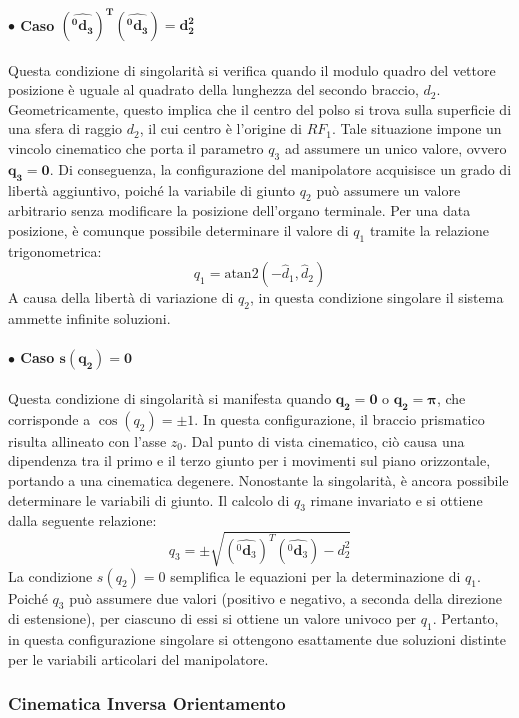 ﻿\documentclass[11pt, a4paper]{article}
\begin{document}
\newpage
\paragraph{\(\bullet\) Caso \(\mathbf{(\hat{^{0}\mathbf{d}_{3}})^{T} (\hat{^{0}\mathbf{d}_{3}}) = d_{2}^{2}}\)}
Questa condizione di singolarità si verifica quando il modulo quadro del vettore posizione è uguale al quadrato della lunghezza del secondo braccio, \(d_2\). Geometricamente, questo implica che il centro del polso si trova sulla superficie di una sfera di raggio \(d_2\), il cui centro è l'origine di \(RF_{1}\). Tale situazione impone un vincolo cinematico che porta il parametro \(q_3\) ad assumere un unico valore, ovvero \(\mathbf{q_3 = 0}\). Di conseguenza, la configurazione del manipolatore acquisisce un grado di libertà aggiuntivo, poiché la variabile di giunto \(q_2\) può assumere un valore arbitrario senza modificare la posizione dell'organo terminale. Per una data posizione, è comunque possibile determinare il valore di \(q_1\) tramite la relazione trigonometrica:
\[
    q_{1} = \text{atan2}(-\hat{d}_{1}, \hat{d}_{2})
\]
A causa della libertà di variazione di \(q_2\), in questa condizione singolare il sistema ammette infinite soluzioni.

\paragraph{\(\bullet\) Caso \(\mathbf{s(q_{2}) = 0}\)}
Questa condizione di singolarità si manifesta quando \(\mathbf{q_2 = 0}\) o \(\mathbf{q_2 = \pi}\), che corrisponde a \(\cos(q_{2}) = \pm 1\). In questa configurazione, il braccio prismatico risulta allineato con l'asse \(z_0\). Dal punto di vista cinematico, ciò causa una dipendenza tra il primo e il terzo giunto per i movimenti sul piano orizzontale, portando a una cinematica degenere. Nonostante la singolarità, è ancora possibile determinare le variabili di giunto. Il calcolo di \(q_3\) rimane invariato e si ottiene dalla seguente relazione:
\[
    q_{3} = \pm \sqrt{(\hat{^{0}\mathbf{d}_{3}})^{T} (\hat{^{0}\mathbf{d}_{3}}) - d_{2}^{2}}
\]
La condizione \(s(q_2)=0\) semplifica le equazioni per la determinazione di \(q_1\). Poiché \(q_3\) può assumere due valori (positivo e negativo, a seconda della direzione di estensione), per ciascuno di essi si ottiene un valore univoco per \(q_1\). Pertanto, in questa configurazione singolare si ottengono esattamente due soluzioni distinte per le variabili articolari del manipolatore.

\newpage
\subsubsection*{Cinematica Inversa Orientamento}
\end{document}
